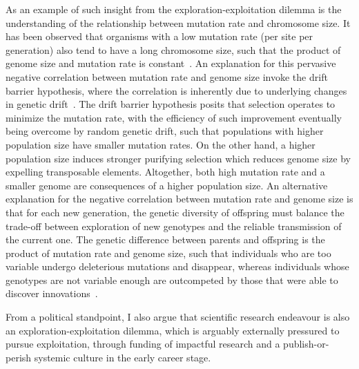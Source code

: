 As an example of such insight from the exploration-exploitation dilemma is the understanding of the relationship between mutation rate and chromosome size.
It has been observed that organisms with a low mutation rate (per site per generation) also tend to have a long chromosome size, such that the product of genome size and mutation rate is constant~\citep{Drake1991}.
An explanation for this pervasive negative correlation between mutation rate and genome size invoke the drift barrier hypothesis, where the correlation is inherently due to underlying changes in genetic drift~\citep{Lynch2016a}.
The drift barrier hypothesis posits that selection operates to minimize the mutation rate, with the efficiency of such improvement eventually being overcome by random genetic drift, such that populations with higher population size have smaller mutation rates.
On the other hand, a higher population size induces stronger purifying selection which reduces genome size by expelling transposable elements.
Altogether, both high mutation rate and a smaller genome are consequences of a higher population size.
An alternative explanation for the negative correlation between mutation rate and genome size is that for each new generation, the genetic diversity of offspring must balance the trade-off between exploration of new genotypes and the reliable transmission of the current one.
The genetic difference between parents and offspring is the product of mutation rate and genome size, such that individuals who are too variable undergo deleterious mutations and disappear, whereas individuals whose genotypes are not variable enough are outcompeted by those that were able to discover innovations~\citep{Knibbe2007, Beslon2010, Hindre2012, Batut2014, Biller2016}.

From a political standpoint, I also argue that scientific research endeavour is also an exploration-exploitation dilemma, which is arguably externally pressured to pursue exploitation, through funding of impactful research and a publish-or-perish systemic culture in the early career stage.

